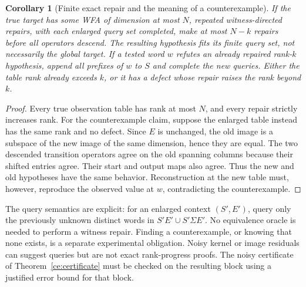 \documentclass[11pt]{article}
\newtheorem{corollary}[theorem]{Corollary}
\theoremstyle{definition}
\theoremstyle{remark}
\begin{document}
\begin{corollary}[Finite exact repair and the meaning of a counterexample]
\label{ce:repair-termination}
If the true target has some WFA of dimension at most $N$, repeated
witness-directed repairs, with each enlarged query set completed, make at
most $N-k$ repairs before all operators descend. The resulting hypothesis
fits its finite query set, not necessarily the global target.
If a tested word $w$ refutes an already repaired rank-$k$ hypothesis,
append all prefixes of $w$ to $S$ and complete the new queries. Either
the table rank already exceeds $k$, or it has a defect whose repair raises
the rank beyond $k$.
\end{corollary}
\begin{proof}
Every true observation table has rank at most $N$, and every repair
strictly increases rank. For the counterexample claim, suppose the enlarged
table instead has the same rank and no defect. Since $E$ is unchanged,
the old image is a subspace of the new image of the same dimension, hence
they are equal. The two descended transition operators agree on the old
spanning columns because their shifted entries agree. Their start and
output maps also agree. Thus the new and old hypotheses have the same
behavior. Reconstruction at the new table must, however, reproduce the
observed value at $w$, contradicting the counterexample.
\end{proof}

The query semantics are explicit: for an enlarged context $(S',E')$,
query only the previously unknown distinct words in
$S'E'\cup S'\Sigma E'$. No equivalence oracle is needed to perform a
witness repair. Finding a counterexample, or knowing that none exists, is
a separate experimental obligation. Noisy kernel or image residuals can
suggest queries but are not exact rank-progress proofs. The noisy
certificate of Theorem~\ref{ce:certificate} must be checked on the
resulting block using a justified error bound for that block.
\end{document}
